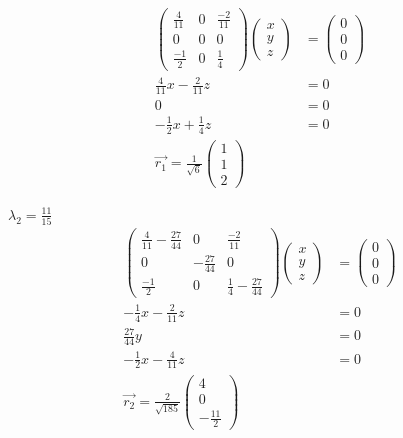 \begin{align*}
  \begin{pmatrix} \frac{4}{11}&0&\frac{-2}{11}\\ 0&0&0\\ \frac{-1}{2}&0&\frac{1}{4}\end{pmatrix} \begin{pmatrix} x\\ y\\ z\end{pmatrix} &= \begin{pmatrix} 0\\ 0\\ 0\end{pmatrix} \\
  \frac{4}{11}x - \frac{2}{11}z &= 0 \\
  0 &= 0 \\
  -\frac{1}{2}x + \frac{1}{4}z &= 0 \\
  \vec{r_1} = \frac{1}{\sqrt{6}} \begin{pmatrix} 1\\ 1\\ 2\end{pmatrix}
\end{align*}

$\lambda_2 = \frac{11}{15}$
\begin{align*}
  \begin{pmatrix} \frac{4}{11}-\frac{27}{44}&0&\frac{-2}{11}\\ 0&-\frac{27}{44}&0\\ \frac{-1}{2}&0&\frac{1}{4}-\frac{27}{44}\end{pmatrix} \begin{pmatrix} x\\ y\\ z\end{pmatrix} &= \begin{pmatrix} 0\\ 0\\ 0\end{pmatrix} \\
  -\frac{1}{4}x - \frac{2}{11}z &= 0 \\
  \frac{27}{44}y &= 0 \\
  -\frac{1}{2}x - \frac{4}{11} z &= 0 \\
  \vec{r_2} = \frac{2}{\sqrt{185}} \begin{pmatrix} 4\\ 0\\ -\frac{11}{2} \end{pmatrix}
\end{align*}



